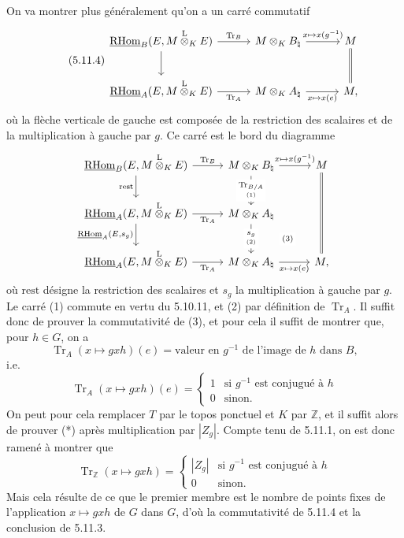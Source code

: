 \documentclass[11pt]{article}
\newcommand{\R}{\mathrm{R}}\newcommand{\RHomCore}{\mathrm{RHom}}
\providecommand{\RHom}{\RHomCore}
\providecommand{\uRHom}{\underline{\RHom}}
\providecommand{\Tr}{\operatorname{Tr}}
\providecommand{\Tr}{\operatorname{Tr}}
\providecommand{\lten}{\overset{\mathrm L}{\otimes}}
\providecommand{\Tr}{\operatorname{Tr}}
\providecommand{\RHom}{\RHomCore}
\providecommand{\lten}{\overset{\mathrm L}{\otimes}}
\providecommand{\RHom}{\R\mathcal{H}om}
\providecommand{\lten}{\overset{\mathrm L}{\otimes}}
\providecommand{\R}{\mathrm R}
\providecommand{\Tr}{\operatorname{Tr}}
\providecommand{\lten}{\overset{\mathrm L}{\otimes}}
\providecommand{\lten}{\overset{\mathrm L}{\otimes}}
\providecommand{\lten}{\overset{\mathrm L}{\otimes}}
\providecommand{\RHom}{\RHomCore}
\providecommand{\Tr}{\operatorname{Tr}}
\providecommand{\lten}{\overset{\mathrm L}{\otimes}}
\begin{document}
On va
montrer plus généralement qu'on a un carré commutatif
\begin{equation}\tag{5.11.4}
\begin{tikzcd}[column sep=3.0em,row sep=2.2em]
\uRHom_B(E,M\lten_KE) \arrow[r,"\Tr_B"] \arrow[d] &
M\otimes_KB_\natural \arrow[r,"{x\mapsto x(g^{-1})}"] &
M \arrow[d,equal] \\
\uRHom_A(E,M\lten_KE) \arrow[r,"\Tr_A"'] &
M\otimes_KA_\natural \arrow[r,"{x\mapsto x(e)}"'] &
M,
\end{tikzcd}
\end{equation}
où la flèche verticale de gauche est composée de la restriction des scalaires et de la multiplication à gauche par $g$. Ce carré est le bord du diagramme
\[
\begin{tikzcd}[column sep=2.8em,row sep=2.0em]
\uRHom_B(E,M\lten_KE) \arrow[r,"\Tr_B"] \arrow[d,"\mathrm{rest}"'] &
M\otimes_KB_\natural \arrow[r,"{x\mapsto x(g^{-1})}"] \arrow[d,"{\underset{(1)}{\Tr_{B/A}}}" description] &
M \arrow[dd,equal] \\
\uRHom_A(E,M\lten_KE) \arrow[r,"\Tr_A"'] \arrow[d,"{\uRHom_A(E,s_g)}"'] &
M\otimes_KA_\natural \arrow[d,"{\underset{(2)}{s_g}}" description] \arrow[dr,phantom,"\scriptstyle(3)" description] &
\\
\uRHom_A(E,M\lten_KE) \arrow[r,"\Tr_A"'] &
M\otimes_KA_\natural \arrow[r,"{x\mapsto x(e)}"'] &
M,
\end{tikzcd}
\]
où $\mathrm{rest}$ désigne la restriction des scalaires et $s_g$ la multiplication à gauche par $g$. Le carré (1) commute en vertu du 5.10.11, et (2) par définition de $\Tr_A$. Il suffit donc de prouver la commutativité de (3), et pour cela il suffit de montrer que, pour $h\in G$, on a
\[
\Tr_A(x\mapsto gxh)(e)=\text{valeur en }g^{-1}\text{ de l'image de }h\text{ dans }B,
\]
i.e.
\begin{equation}\tag{*}
\Tr_A(x\mapsto gxh)(e)=
\begin{cases}
1 & \text{si } g^{-1}\text{ est conjugué à }h\\
0 & \text{sinon}.
\end{cases}
\end{equation}
On peut pour cela remplacer $T$ par le topos ponctuel et $K$ par $\mathbb Z$, et il suffit alors de prouver (*) après multiplication par $|Z_g|$. Compte tenu de 5.11.1, on est donc ramené à montrer que
\[
\Tr_{\mathbb Z}(x\mapsto gxh)=
\begin{cases}
|Z_g| & \text{si } g^{-1}
\text{ est conjugué à }h\\
0 & \text{sinon}.
\end{cases}
\]
Mais cela résulte de ce que le premier membre est le nombre de points fixes de l'application $x\mapsto gxh$ de $G$ dans $G$, d'où la commutativité de 5.11.4 et la conclusion de 5.11.3.
\end{document}
